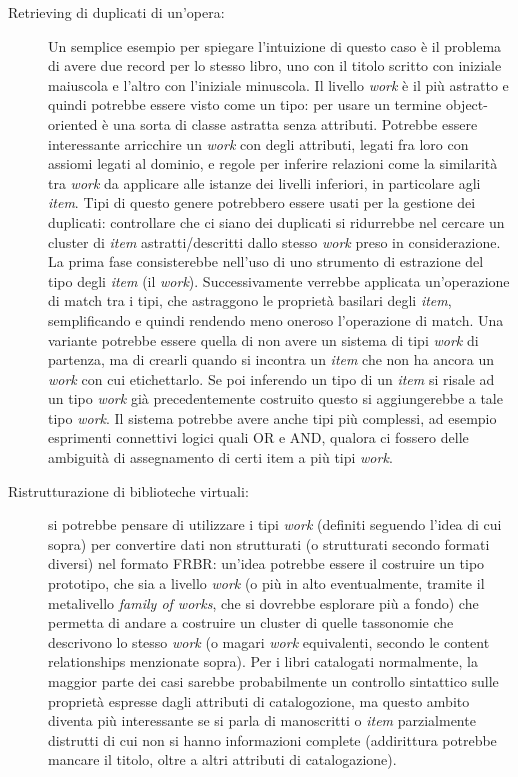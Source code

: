 \begin{description}
	\item[Retrieving di duplicati di un’opera:] Un semplice esempio per spiegare l'intuizione di questo caso è il problema di avere due record per lo stesso libro, uno con il titolo scritto con iniziale maiuscola e l'altro con l'iniziale minuscola. Il livello \emph{work} è il più astratto e quindi potrebbe essere visto come un tipo: per usare un termine object-oriented è una sorta di classe astratta senza attributi. Potrebbe essere 
	interessante arricchire un \emph{work} con degli attributi, legati fra loro con assiomi legati al dominio, e regole per inferire relazioni come la similarità 
	tra \emph{work} da applicare alle istanze dei livelli inferiori, in particolare agli \emph{item}. Tipi di questo genere potrebbero essere usati per la gestione dei 
	duplicati: controllare che ci siano dei duplicati si ridurrebbe nel cercare un cluster di \emph{item} astratti/descritti dallo stesso \emph{work} preso in 
	considerazione. La prima fase consisterebbe nell'uso di uno strumento di estrazione del tipo degli \emph{item} (il \emph{work}). Successivamente verrebbe applicata 
	un'operazione di match tra i tipi, che astraggono le proprietà basilari degli \emph{item}, semplificando e quindi rendendo meno oneroso l'operazione di match. 
	Una variante potrebbe essere quella di non avere un sistema di tipi \emph{work} di partenza, ma di crearli quando si incontra un \emph{item} che non ha ancora un \emph{work} 
	con cui etichettarlo. Se poi inferendo un tipo di un \emph{item} si risale ad un tipo \emph{work} già precedentemente costruito questo si aggiungerebbe a tale tipo \emph{work}. Il sistema potrebbe avere anche tipi più complessi, 
	ad esempio esprimenti connettivi logici quali \textsc{OR} e \textsc{AND}, qualora ci fossero delle ambiguità di assegnamento di certi item a più tipi \emph{work}.
	\item[Ristrutturazione di biblioteche virtuali:] si potrebbe pensare di utilizzare i tipi \emph{work} (definiti seguendo l'idea di cui sopra) per convertire 
	dati non strutturati (o strutturati secondo formati diversi) nel formato FRBR: un'idea potrebbe essere il costruire un tipo prototipo, che sia a 
	livello \emph{work} (o più in alto eventualmente, tramite il metalivello \emph{family of works}, che si dovrebbe esplorare più a fondo) che permetta di andare a 
	costruire un cluster di quelle tassonomie che descrivono lo stesso \emph{work} (o magari \emph{work} equivalenti, secondo le content relationships menzionate sopra). 
	Per i libri catalogati normalmente, la maggior parte dei casi sarebbe probabilmente un controllo sintattico sulle proprietà espresse dagli attributi di 
	catalogozione, ma questo ambito diventa più interessante se si parla di manoscritti o \emph{item} parzialmente distrutti di cui non si hanno informazioni 
	complete (addirittura potrebbe mancare il titolo, oltre a altri attributi di catalogazione).
\end{description}
